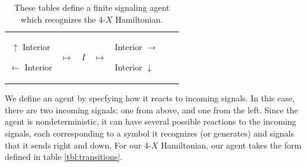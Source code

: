 \documentclass[12pt]{amsbook}
\theoremstyle{plain}
\theoremstyle{definition}
\theoremstyle{remark}
\begin{document}
\begin{table}
{\begin{tabular*}{\columnwidth}{cllclll}
{\begin{trivlist}
\item[$\uparrow$] Interior
\item[$\leftarrow$] Interior
\end{trivlist}}
 & $\longmapsto$ & $I$ & $\longmapsto$ &
\parbox{1.25in}{\noindent
\begin{trivlist}
\item[] Interior $\rightarrow$
\item[] Interior $\downarrow$
\end{trivlist}} \\
\bottomrule
\end{tabular*}
}

\caption{These tables define a finite signaling agent which recognizes the 4-$X$ Hamiltonian.}

\end{table}

We define an agent by specfying how it reacts to incoming signals.  In this case, there are two incoming signals:  one from above, and one from the left.  Since the agent is nondeterministic, it can have several possible reactions to the incoming signals, each corresponding to a symbol it recognizes (or generates) and signals that it sends right and down.  For our 4-$X$ Hamiltonian, our agent takes the form defined in table \ref{tbl:transitions}.
\end{document}
